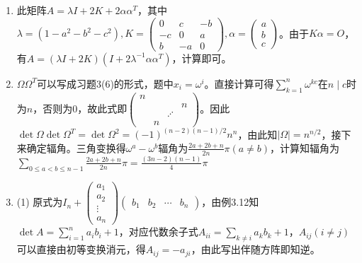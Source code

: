 \documentclass[a4paper,UTF8,fontset=windows]{ctexart}
\begin{document}
\begin{enumerate}
(8) 将组合数写为阶乘从行列中分别提取出$\frac{\prod_{i=1}^{n}\left(p+i\right)!}{\prod_{i=1}^{n}\left(q+i\right)!}$，则剩余为$\left(\frac{1}{(p-q+i-j)!}\right)$，从每行中同除以第一列，提取出$\frac{1}{\prod_{i=0}^{n-1}(p-q+i)!}$，其余通过类似多项式的列变换方式，可化为$(p+q+i-1)^{j-1}$，由范德蒙德行列式得值为$\prod_{i=0}^{n-1}i!$，故最终为$\prod_{i=1}^{n}\frac{\left(i-1\right)!\left(p+i\right)}{\left(p-q+i-1\right)!\left(q+i\right)!}$

\item
此矩阵$A=\lambda I+2K+2\alpha\alpha^T$，其中$\lambda=(1-a^2-b^2-c^2),K=\begin{pmatrix}0&c&-b\\-c&0&a\\b&-a&0\end{pmatrix},\alpha=\begin{pmatrix}a\\b\\c\end{pmatrix}$。由于$K\alpha=O$，有$A=(\lambda I+2K)(I+2\lambda^{-1}\alpha\alpha^T)$，计算即可。

\item
$\Omega\Omega^T$可以写成习题3(6)的形式，题中$x_i=\omega^i$。直接计算可得$\sum_{k=1}^{n}\omega^{kc}$在$n\mid c$时为$n$，否则为0，故此式即$\begin{pmatrix}n&&&\\&&&n\\[-1ex]&&\iddots&\\[-1ex]&n&&\end{pmatrix}$。因此$\det{\Omega}\det{\Omega^T}=\det{\Omega^2}=(-1)^{(n-2)(n-1)/2}n^n$，由此知$|\Omega|=n^{n/2}$，接下来确定辐角。三角变换得$\omega^a-\omega^b$辐角为$\frac{2a+2b+n}{2n}\pi\left(a\ne b\right)$，计算知辐角为$\sum_{0\le a<b\le n-1}{\frac{2a+2b+n}{2n}\pi}=\frac{(3n-2)(n-1)}{4}\pi$

\item
(1) 原式为$I_n+\begin{pmatrix}a_1\\a_2\\\vdots\\a_n\end{pmatrix}\begin{pmatrix}b_1&b_2&\cdots&b_n\end{pmatrix}$，由例3.12知$\det A =\sum_{i=1}^{n}{a_ib_i}+1$，对应代数余子式$A_{ii}=\sum_{k\ne i} a_kb_k+1$，$A_{ij}(i\ne j)$可以直接由初等变换消元，得$A_{ij}=-a_{ji}$，由此写出伴随方阵即知逆。


\end{enumerate}
\end{document}
